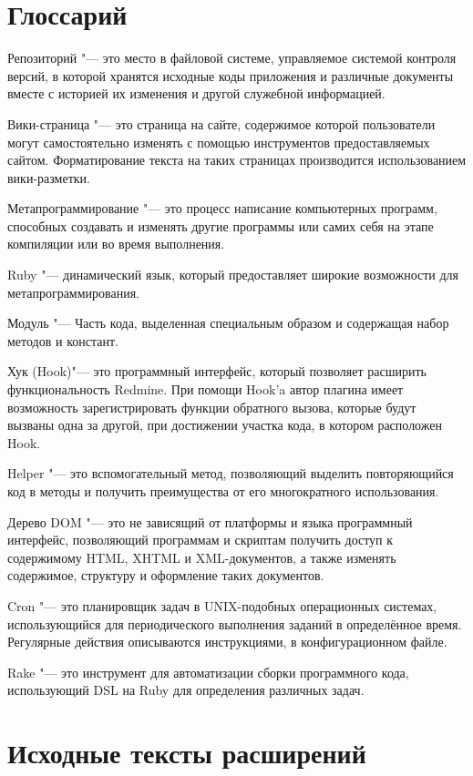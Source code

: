 \appendix

\makeatletter
\gdef\thechapter{\@Asbuk\c@chapter}
\makeatother

\chapter{Глоссарий}
\label{glossary}
Репозиторий "--- это место в файловой системе, управляемое системой контроля
версий, в которой хранятся исходные коды приложения и различные документы
вместе с историей их изменения и другой служебной информацией.

Вики-страница "--- это страница на сайте, содержимое которой пользователи могут
самостоятельно изменять с помощью инструментов предоставляемых сайтом.
Форматирование текста на таких страницах производится использованием
вики-разметки.

Метапрограммирование "--- это процесс написание компьютерных программ,
способных создавать и изменять другие программы или самих себя на этапе
компиляции или во время выполнения.

Ruby "--- динамический язык, который предоставляет широкие возможности для
метапрограммирования.

Модуль "--- Часть кода, выделенная специальным образом и
содержащая набор методов и констант.

Хук (Hook)"--- это программный интерфейс, который позволяет расширить
функциональность Redmine. При помощи Hook'a автор плагина имеет возможность
зарегистрировать функции обратного вызова, которые будут вызваны одна за
другой, при достижении участка кода, в котором расположен Hook.

Helper "--- это вспомогательный метод, позволяющий выделить
повторяющийся код в методы и получить преимущества от его многократного
использования.

Дерево DOM "---  это не зависящий от платформы и языка программный интерфейс,
позволяющий программам и скриптам получить доступ к содержимому HTML, XHTML и
XML-документов, а также изменять содержимое, структуру и оформление таких
документов.

Cron "--- это планировщик задач в UNIX-подобных операционных системах,
использующийся для периодического выполнения заданий в определённое время.
Регулярные действия описываются инструкциями, в конфигурационном файле.

Rake "--- это инструмент для автоматизации сборки программного кода,
использующий DSL на Ruby для определения различных задач.


\chapter{Исходные тексты расширений}

